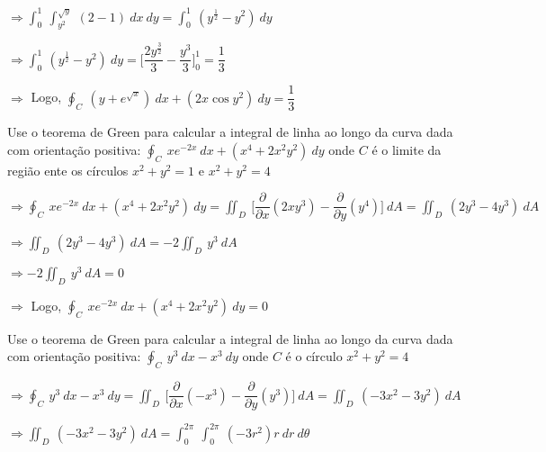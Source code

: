 \documentclass[11pt,a4paper]{article}
\begin{document}
\begin{enumerate}
{		$\Rightarrow \displaystyle\int_{0}^{1}\ \displaystyle\int_{y^2}^{\sqrt{y}}\ (2 - 1)\ dx\ dy = \displaystyle\int_{0}^{1}\ (y^{\frac{1}{2}} - y^2)\ dy$
		
		$\Rightarrow \displaystyle\int_{0}^{1}\ (y^{\frac{1}{2}} - y^2)\ dy = \Bigg[\dfrac{2y^{\frac{3}{2}}}{3} - \dfrac{y^3}{3}\Bigg]_0^1 = \dfrac{1}{3}$
		
		$\Rightarrow$ Logo, $\displaystyle\oint_C\ (y + e^{\sqrt{x}})\ dx + (2x \cos y^2)\ dy = \dfrac{1}{3}$
		
		\item Use o teorema de Green para calcular a integral de linha ao longo da curva dada com orientação positiva: $\displaystyle\oint_C\ xe^{-2x}\ dx + (x^4 + 2x^2y^2)\ dy$ onde $C$ é o limite da região ente os círculos $x^2 + y^2 = 1$ e $x^2 + y^2 = 4$
		
		$\Rightarrow \displaystyle\oint_C\ xe^{-2x}\ dx + (x^4 + 2x^2y^2)\ dy = \displaystyle\iint_D\ \Bigg[\dfrac{\partial}{\partial x}(2xy^3) - \dfrac{\partial}{\partial y}(y^4)\Bigg]\ dA = \displaystyle\iint_D\ (2y^3 - 4y^3)\ dA$
		
		$\Rightarrow \displaystyle\iint_D\ (2y^3 - 4y^3)\ dA = -2\displaystyle\iint_D\ y^3\ dA$
		
		$\Rightarrow -2\displaystyle\iint_D\ y^3\ dA = 0$
		
		$\Rightarrow$ Logo, $\displaystyle\oint_C\ xe^{-2x}\ dx + (x^4 + 2x^2y^2)\ dy = 0$
		
		\item Use o teorema de Green para calcular a integral de linha ao longo da curva dada com orientação positiva: $\displaystyle\oint_C\ y^3\ dx - x^3\ dy $ onde $C$ é o círculo $x^2 + y^2 = 4$
		
		$\Rightarrow \displaystyle\oint_C\ y^3\ dx - x^3\ dy = \displaystyle\iint_D\ \Bigg[\dfrac{\partial}{\partial x}(-x^3) - \dfrac{\partial}{\partial y}(y^3)\Bigg]\ dA = \displaystyle\iint_D\ (-3x^2 - 3y^2)\ dA$
		
		$\Rightarrow \displaystyle\iint_D\ (-3x^2 - 3y^2)\ dA = \displaystyle\int_{0}^{2\pi}\ \displaystyle\int_{0}^{2\pi}\ (-3r^2)r\ dr\ d\theta$
		
}
\end{enumerate}
\end{document}
